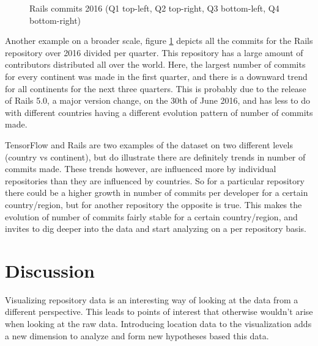 \documentclass[acmtog, authorversion]{acmart}
\begin{document}
\begin{figure}
\caption{Rails commits 2016 (Q1 top-left, Q2 top-right, Q3 bottom-left, Q4 bottom-right)}
\label{fig:rails-2016}
\end{figure}

Another example on a broader scale, figure \ref{fig:rails-2016} depicts all the commits for the Rails \cite{Rails} repository over 2016 divided per quarter.
This repository has a large amount of contributors distributed all over the world.
Here, the largest number of commits for every continent was made in the first quarter, and there is a downward trend for all continents for the next three quarters.
This is probably due to the release of Rails 5.0, a major version change, on the 30th of June 2016, and has less to do with different countries having a different evolution pattern of number of commits made.

TensorFlow and Rails are two examples of the dataset on two different levels (country vs continent), but do illustrate there are definitely trends in number of commits made.
These trends however, are influenced more by individual repositories than they are influenced by countries.
So for a particular repository there could be a higher growth in number of commits per developer for a certain country/region, but for another repository the opposite is true.
This makes the evolution of number of commits fairly stable for a certain country/region, and invites to dig deeper into the data and start analyzing on a per repository basis.

\FloatBarrier
\cleardoublepage
\section{Discussion}
Visualizing repository data is an interesting way of looking at the data from a different perspective.
This leads to points of interest that otherwise wouldn't arise when looking at the raw data.
Introducing location data to the visualization adds a new dimension to analyze and form new hypotheses based this data.
\end{document}
